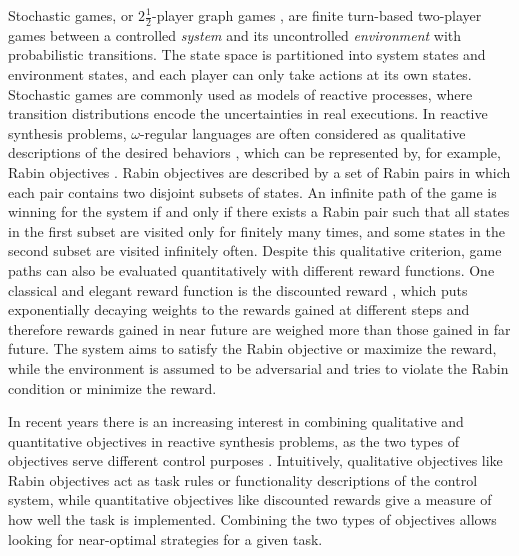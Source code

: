 \documentclass[runningheads,a4paper]{llncs}
\begin{document}
Stochastic games, or $2\frac{1}{2}$-player graph games \cite{chatterjee2012survey}, are finite turn-based two-player games between a controlled \emph{system} and its uncontrolled \emph{environment} with probabilistic transitions. The state space is partitioned into system states and environment states, and each player can only take actions at its own states. Stochastic games are commonly used as models of reactive processes, where transition distributions encode the uncertainties in real executions. In reactive synthesis problems, $\omega$-regular languages are often considered as qualitative descriptions of the desired behaviors \cite{kress2007s}, which can be represented by, for example, Rabin objectives \cite{thomas1997languages}. Rabin objectives are described by a set of Rabin pairs in which each pair contains two disjoint subsets of states. An infinite path of the game is winning for the system if and only if there exists a Rabin pair such that all states in the first subset are visited only for finitely many times, and some states in the second subset are visited infinitely often. Despite this qualitative criterion, game paths can also be evaluated quantitatively with different reward functions. One classical and elegant reward function is the discounted reward \cite{shapley1953stochastic, littman1994markov, filar1996competitive}, which puts exponentially decaying weights to the rewards gained at different steps and therefore rewards gained in near future are weighed more than those gained in far future. The system aims to satisfy the Rabin objective or maximize the reward, while the environment is assumed to be adversarial and tries to violate the Rabin condition or minimize the reward.

In recent years there is an increasing interest in combining qualitative and quantitative objectives in reactive synthesis problems, as the two types of objectives serve different control purposes \cite{bloem2009better, chen2013synthesis, chatterjee2005mean, chatterjee2014perfect}. Intuitively, qualitative objectives like Rabin objectives act as task rules or functionality descriptions of the control system, while quantitative objectives like discounted rewards give a measure of how well the task is implemented. Combining the two types of objectives allows looking for near-optimal strategies for a given task.
\end{document}
